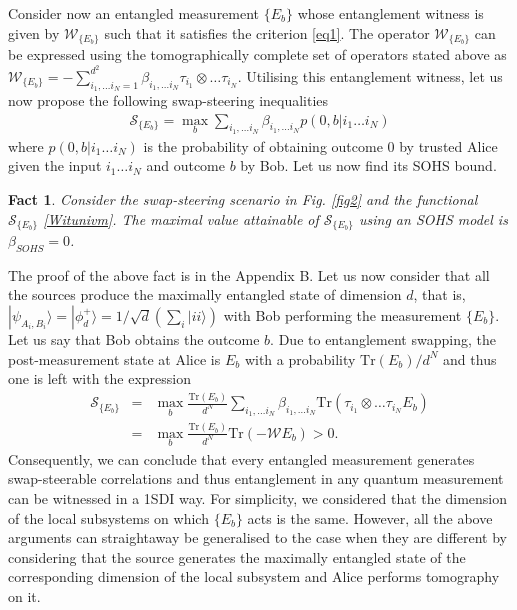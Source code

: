 \documentclass[pra,twocolumn,showpacs]{revtex4-2}
\newcommand{\Tr}[1]{\mathrm{Tr}#1}
\newcommand{\ket}[1]{|#1\rangle}
\theoremstyle{plain}
\newtheorem{fakt}{Fact}
\theoremstyle{definition}
\theoremstyle{remark}
\begin{document}
Consider now an entangled measurement $\{E_b\}$ whose entanglement witness is given by $\mathcal{W}_{\{E_b\}}$ such that it satisfies the criterion \eqref{eq1}. The operator $\mathcal{W}_{\{E_b\}}$ can be expressed using the tomographically complete set of operators stated above as $\mathcal{W}_{\{E_b\}}=-\sum_{i_1,\ldots i_N=1}^{d^2}\beta_{i_1,\ldots i_N}\tau_{i_1}\otimes\ldots\tau_{i_N}$. Utilising this entanglement witness, let us now propose the following swap-steering inequalities 
\begin{eqnarray}\label{Witunivm}
    \mathcal{S}_{\{E_b\}}=\max_{b}\sum_{i_1,\ldots i_N}\beta_{i_1,\ldots i_N}p(0,b|i_1\ldots i_N)
\end{eqnarray}
where $p(0,b|i_1\ldots i_N)$ is the probability of obtaining outcome $0$ by trusted Alice given the input $i_1\ldots i_N$ and outcome $b$ by Bob.
Let us now find its SOHS bound.
\begin{fakt}
    Consider the swap-steering scenario in Fig. \ref{fig2} and the functional $\mathcal{S}_{\{E_b\}}$ \eqref{Witunivm}. The maximal value attainable of $\mathcal{S}_{\{E_b\}}$ using an SOHS model is $\beta_{SOHS}=0$. 
\end{fakt}

The proof of the above fact is in the Appendix B.
Let us now consider that all the sources produce the maximally entangled state of dimension $d$, that is,  $\ket{\psi_{A_i,B_i}}=\ket{\phi^+_d}=1/\sqrt{d}(\sum_{i}\ket{ii})$ with Bob performing the measurement $\{E_b\}$. Let us say that Bob obtains the outcome $b$. Due to entanglement swapping, the post-measurement state at Alice is $E_b$ with a probability $\Tr(E_b)/d^{N}$ and thus one is left with the expression
\begin{eqnarray}\label{eq9}
    \mathcal{S}_{\{E_b\}}&=&\max_{b}\frac{\Tr(E_b)}{d^N}\sum_{i_1,\ldots i_N}\beta_{i_1,\ldots i_N}\Tr(\tau_{i_1}\otimes\ldots\tau_{i_N} E_b)\nonumber\\&=&\max_{b}\frac{\Tr(E_b)}{d^N}\Tr(-\mathcal{W}E_b)>0.
\end{eqnarray} 
Consequently, we can conclude that every entangled measurement generates swap-steerable correlations and thus entanglement in any quantum measurement can be witnessed in a 1SDI way. For simplicity, we considered that the dimension of the local subsystems on which $\{E_b\}$ acts is the same. However, all the above arguments can straightaway be generalised to the case when they are different by considering that the source generates the maximally entangled state of the corresponding dimension of the local subsystem and Alice performs tomography on it. 
\end{document}
